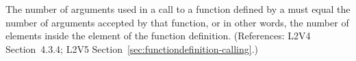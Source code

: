 The number of arguments used in a call to a function defined by a
\FunctionDefinition must equal the number of arguments accepted by that
function, or in other words, the number of  elements inside the
 element of the function definition.  (References: L2V4 Section~4.3.4; L2V5
Section~\ref{sec:functiondefinition-calling}.)
